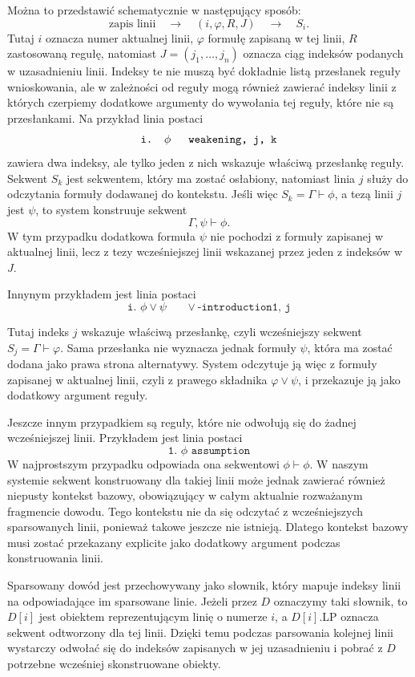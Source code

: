\documentclass[shortabstract]{iithesis}
\theoremstyle{definition}
\theoremstyle{remark}
\theoremstyle{plain}
\begin{document}
Można to przedstawić schematycznie w następujący sposób:
\[
\text{zapis linii}
\quad\longrightarrow\quad
(i,\varphi,R,J)
\quad\longrightarrow\quad
S_i.
\]
Tutaj \(i\) oznacza numer aktualnej linii, \(\varphi\) formułę zapisaną w tej linii,
\(R\) zastosowaną regułę, natomiast \(J=(j_1,\ldots,j_n)\) oznacza ciąg indeksów
podanych w uzasadnieniu linii. Indeksy te nie muszą być dokładnie listą przesłanek
reguły wnioskowania, ale w zależności od reguły mogą również zawierać indeksy linii z których czerpiemy dodatkowe argumenty do wywołania tej reguły, które nie są przesłankami. 
Na przykład linia postaci
\[
    \texttt{i. $\phi$ \quad   weakening, j, k}
\]
zawiera dwa indeksy, ale tylko jeden z nich wskazuje właściwą przesłankę reguły.
Sekwent \(S_k\) jest sekwentem, który ma zostać osłabiony, natomiast linia \(j\)
służy do odczytania formuły dodawanej do kontekstu. Jeśli więc
\(S_k = \Gamma \vdash \phi\), a tezą linii \(j\) jest \(\psi\), to system konstruuje
sekwent
\[
    \Gamma,\psi \vdash \phi.
\]
W tym przypadku dodatkowa formuła \(\psi\) nie pochodzi z formuły zapisanej
w aktualnej linii, lecz z tezy wcześniejszej linii wskazanej przez jeden z indeksów
w \(J\).

Innynym przykładem jest linia postaci
\[
    \texttt{i. $\phi \lor \psi \quad$ $\lor$-introduction1, j}
\]

Tutaj indeks \(j\) wskazuje właściwą przesłankę, czyli wcześniejszy sekwent
\(S_j = \Gamma \vdash \varphi\). Sama przesłanka nie wyznacza jednak formuły
\(\psi\), która ma zostać dodana jako prawa strona alternatywy. System odczytuje
ją więc z formuły zapisanej w aktualnej linii, czyli z prawego składnika
\(\varphi \vee \psi\), i przekazuje ją jako dodatkowy argument reguły.


Jeszcze innym przypadkiem są reguły, które nie odwołują się do żadnej wcześniejszej
linii. Przykładem jest linia postaci
\[
\texttt{1. $\phi$    assumption}
\]
W najprostszym przypadku odpowiada ona sekwentowi \(\phi \vdash \phi\). W naszym
systemie sekwent konstruowany dla takiej linii może jednak zawierać również niepusty
kontekst bazowy, obowiązujący w całym aktualnie rozważanym fragmencie dowodu.
Tego kontekstu nie da się odczytać z wcześniejszych sparsowanych linii, ponieważ
takowe jeszcze nie istnieją. Dlatego kontekst bazowy musi zostać przekazany explicite
jako dodatkowy argument podczas konstruowania linii.


Sparsowany dowód jest przechowywany jako słownik, który mapuje indeksy linii na
odpowiadające im sparsowane linie. Jeżeli przez \(D\) oznaczymy taki słownik, to
\(D[i]\) jest obiektem reprezentującym linię o numerze \(i\), a \(D[i].\mathrm{LP}\)
oznacza sekwent odtworzony dla tej linii. Dzięki temu podczas parsowania kolejnej
linii wystarczy odwołać się do indeksów zapisanych w jej uzasadnieniu i pobrać z
\(D\) potrzebne wcześniej skonstruowane obiekty.
\end{document}
